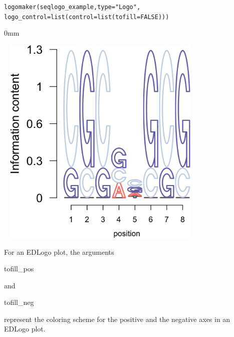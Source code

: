 \documentclass[12pt]{article}\usepackage[]{graphicx}\usepackage[usenames,dvipsnames]{color}
\newcommand{\hlnum}[1]{\textcolor[rgb]{0.816,0.125,0.439}{#1}}%
\newcommand{\hlstr}[1]{\textcolor[rgb]{0.251,0.627,0.251}{#1}}%
\newcommand{\hlstd}[1]{\textcolor[rgb]{0.251,0.251,0.251}{#1}}%
\newcommand{\hlkwc}[1]{\textcolor[rgb]{0.251,0.251,0.251}{#1}}%
\newcommand{\hlkwd}[1]{\textcolor[rgb]{0.878,0.439,0.125}{#1}}%
\newenvironment{knitrout}{}{} %
\begin{document}
\begin{knitrout}
\color{fgcolor}\begin{kframe}
\begin{alltt}
\hlkwd{logomaker}\hlstd{(seqlogo_example,} \hlkwc{type} \hlstd{=} \hlstr{"Logo"}\hlstd{,}
          \hlkwc{logo_control} \hlstd{=} \hlkwd{list}\hlstd{(}\hlkwc{control} \hlstd{=} \hlkwd{list}\hlstd{(}\hlkwc{tofill}\hlstd{=} \hlnum{FALSE}\hlstd{)))}
\end{alltt}
\end{kframe}\begin{adjustwidth}{\fltoffset}{0mm}

\includegraphics[width=4in,height=4in]{figure/fill-1} \hfill{}

\end{adjustwidth}
\end{knitrout}

For an EDLogo plot, the arguments \begin{verb} tofill_pos \end{verb} and \begin{verb} tofill_neg \end{verb} represent the coloring scheme for the positive and the negative axes in an EDLogo plot.
\end{document}
